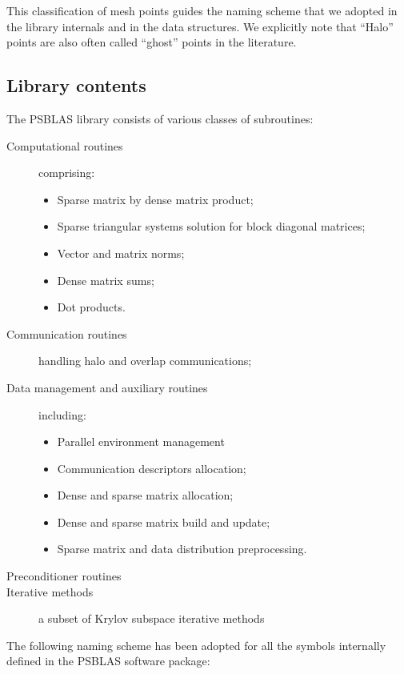 This classification of mesh points guides the naming scheme that we
adopted in the library internals and in the data structures. We
explicitly note that ``Halo'' points are also often called ``ghost''
points in the literature. 



\subsection{Library contents}

The PSBLAS library consists of various classes of subroutines:
\begin{description}
\item[Computational routines] comprising:
\begin{itemize}
\item Sparse matrix by dense matrix product; 
\item Sparse triangular
systems solution for block diagonal matrices;
\item Vector and matrix norms;
\item Dense matrix sums;
\item Dot products.
\end{itemize} 
\item[Communication routines] handling halo and overlap
  communications;
\item[Data management and auxiliary routines] including:
\begin{itemize}
\item Parallel environment management
\item Communication descriptors allocation;
\item Dense and sparse matrix allocation;
\item Dense and sparse matrix build and update;
\item Sparse matrix and data distribution preprocessing.
\end{itemize} 
\item[Preconditioner routines]
\item[Iterative methods] a subset of Krylov subspace iterative
  methods
\end{description}
The following naming scheme has been adopted for all the symbols
internally defined in the PSBLAS software package:
